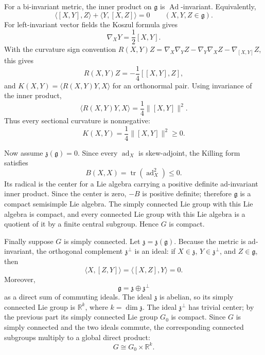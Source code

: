 \begin{solution}
For a bi-invariant metric, the inner product on $\mathfrak{g}$ is
$\operatorname{Ad}$-invariant. Equivalently,
\[
    \langle [X,Y],Z\rangle+\langle Y,[X,Z]\rangle=0
    \qquad
    (X,Y,Z\in\mathfrak{g}).
\]
For left-invariant vector fields the Koszul formula gives
\[
    \nabla_XY=\frac{1}{2}[X,Y].
\]
With the curvature sign convention
$R(X,Y)Z=\nabla_X\nabla_YZ-\nabla_Y\nabla_XZ-\nabla_{[X,Y]}Z$, this gives
\[
    R(X,Y)Z=-\frac{1}{4}[[X,Y],Z],
\]
and $K(X,Y)=\langle R(X,Y)Y,X\rangle$ for an orthonormal pair. Using invariance of
the inner product,
\[
    \langle R(X,Y)Y,X\rangle
    =
    \frac{1}{4}\|[X,Y]\|^2.
\]
Thus every sectional curvature is nonnegative:
\[
    K(X,Y)=\frac{1}{4}\|[X,Y]\|^2\geq 0.
\]

Now assume $\mathfrak{z}(\mathfrak{g})=0$. Since every $\operatorname{ad}_X$ is
skew-adjoint, the Killing form satisfies
\[
    B(X,X)=\operatorname{tr}(\operatorname{ad}_X^2)\leq 0.
\]
Its radical is the center for a Lie algebra carrying a positive definite
ad-invariant inner product. Since the center is zero, $-B$ is positive definite;
therefore $\mathfrak{g}$ is a compact semisimple Lie algebra. The simply connected
Lie group with this Lie algebra is compact, and every connected Lie group with
this Lie algebra is a quotient of it by a finite central subgroup. Hence $G$ is
compact.

Finally suppose $G$ is simply connected. Let
$\mathfrak{z}=\mathfrak{z}(\mathfrak{g})$. Because the metric is ad-invariant, the
orthogonal complement $\mathfrak{z}^{\perp}$ is an ideal: if $X\in\mathfrak{z}$,
$Y\in\mathfrak{z}^{\perp}$, and $Z\in\mathfrak{g}$, then
\[
    \langle X,[Z,Y]\rangle=\langle [X,Z],Y\rangle=0.
\]
Moreover,
\[
    \mathfrak{g}=\mathfrak{z}\oplus \mathfrak{z}^{\perp}
\]
as a direct sum of commuting ideals. The ideal $\mathfrak{z}$ is abelian, so its
simply connected Lie group is $\mathbb{R}^k$, where $k=\dim\mathfrak{z}$. The ideal
$\mathfrak{z}^{\perp}$ has trivial center; by the previous part its simply
connected Lie group $G_0$ is compact. Since $G$ is simply connected and the two
ideals commute, the corresponding connected subgroups multiply to a global direct
product:
\[
    G\cong G_0\times \mathbb{R}^k.
\]
\end{solution}

